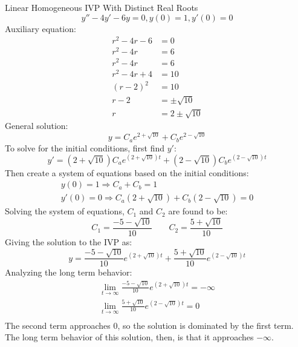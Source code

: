 \documentclass[12pt]{article}
\begin{document}
\begin{example}{Linear Homogeneous IVP With Distinct Real Roots}
  \begin{equation*}
    y'' - 4y' - 6y = 0, y(0) = 1, y'(0) = 0
  \end{equation*}
  Auxiliary equation:
  \begin{align*}
    r^2 - 4r - 6  &= 0  \\
    r^2 - 4r      &= 6  \\
    r^2 - 4r      &= 6 \\
    r^2 - 4r + 4  &= 10 \\
    (r-2)^2       &= 10 \\
    r-2           &= \pm \sqrt{10} \\
    r             &= 2 \pm \sqrt{10}
  \end{align*}
  General solution:
  \begin{equation*}
    y = C_ae^{2 + \sqrt{10}} + C_be^{2 - \sqrt{10}}
  \end{equation*}
  To solve for the initial conditions, first find $y'$:
  \begin{equation*}
    y' = (2 + \sqrt{10})C_ae^{(2 + \sqrt{10})t} + (2 - \sqrt{10})C_be^{(2 - \sqrt{10})t}
  \end{equation*}
  Then create a system of equations based on the initial conditions:
  \begin{gather*}
    y(0) = 1 \Rightarrow C_a + C_b = 1 \\
    y'(0) = 0 \Rightarrow C_a(2 + \sqrt{10}) + C_b(2 - \sqrt{10}) = 0
  \end{gather*}
  Solving the system of equations, $C_1$ and $C_2$ are found to be:
  \begin{equation*}
    C_1 = \frac{-5-\sqrt{10}}{10}\ \ \ \ \ \ \ \ \ C_2 = \frac{5+\sqrt{10}}{10}
  \end{equation*}
  Giving the solution to the IVP as:
  \begin{equation*}
    y = \frac{-5 - \sqrt{10}}{10}e^{(2 + \sqrt{10})t} + \frac{5 + \sqrt{10}}{10}e^{(2 - \sqrt{10})t}
  \end{equation*}
  Analyzing the long term behavior:
  \begin{gather*}
    \lim_{t \to \infty} \frac{-5 - \sqrt{10}}{10}e^{(2 + \sqrt{10})t} = -\infty \\
    \lim_{t \to \infty} \frac{5 + \sqrt{10}}{10}e^{(2 - \sqrt{10})t} = 0 \\
  \end{gather*}
  The second term approaches $0$, so the solution is dominated by the first term. The long term behavior of this solution, then, is that it approaches $-\infty$.
\end{example}
\end{document}

